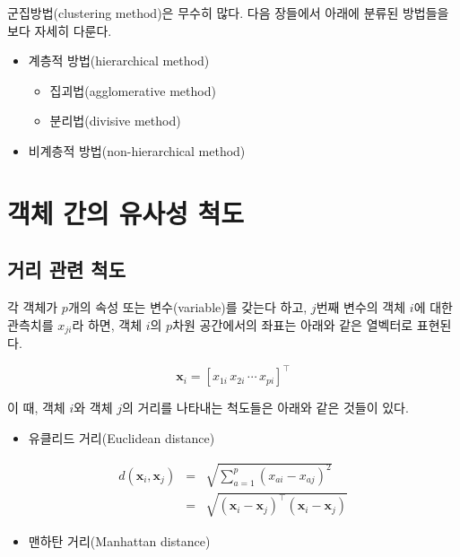 \documentclass[]{book}
\providecommand{\tightlist}{%
  \setlength{\itemsep}{0pt}\setlength{\parskip}{0pt}}
\begin{document}
군집방법(clustering method)은 무수히 많다. 다음 장들에서 아래에 분류된 방법들을 보다 자세히 다룬다.

\begin{itemize}
\tightlist
\item
  계층적 방법(hierarchical method)

  \begin{itemize}
  \tightlist
  \item
    집괴법(agglomerative method)
  \item
    분리법(divisive method)
  \end{itemize}
\item
  비계층적 방법(non-hierarchical method)
\end{itemize}

\hypertarget{object-similarity-metric}{%
\section{객체 간의 유사성 척도}\label{object-similarity-metric}}

\hypertarget{object-distance-metric}{%
\subsection{거리 관련 척도}\label{object-distance-metric}}

각 객체가 \(p\)개의 속성 또는 변수(variable)를 갖는다 하고, \(j\)번째 변수의 객체 \(i\)에 대한 관측치를 \(x_{ji}\)라 하면, 객체 \(i\)의 \(p\)차원 공간에서의 좌표는 아래와 같은 열벡터로 표현된다.

\begin{equation*}
\mathbf{x}_{i} = [x_{1i} \, x_{2i} \, \cdots \, x_{pi}]^\top
\end{equation*}

이 때, 객체 \(i\)와 객체 \(j\)의 거리를 나타내는 척도들은 아래와 같은 것들이 있다.

\begin{itemize}
\tightlist
\item
  유클리드 거리(Euclidean distance)
\end{itemize}

\begin{eqnarray*}
d(\mathbf{x}_i, \mathbf{x}_j) &=& \sqrt{\sum_{a = 1}^{p} \left(x_{ai} - x_{aj}\right)^2}\\
&=& \sqrt{(\mathbf{x}_i - \mathbf{x}_j)^\top (\mathbf{x}_i - \mathbf{x}_j)}
\end{eqnarray*}

\begin{itemize}
\tightlist
\item
  맨하탄 거리(Manhattan distance)
\end{itemize}
\end{document}
